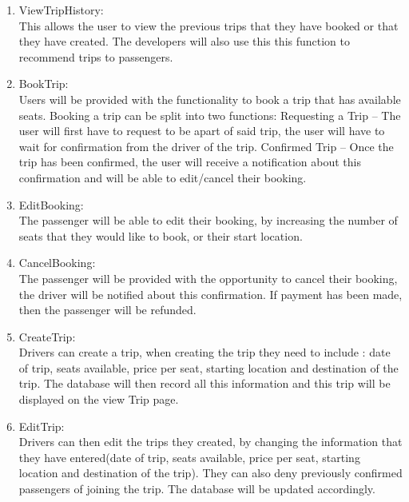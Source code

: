 \documentclass[hidelinks, 12pt, a4paper]{article}
\begin{document}
\begin{enumerate}[label=U1.\arabic*]

      \item ViewTripHistory:\\
            This allows the user to view the previous trips that they have booked or that they have created. The developers will also use this this function to recommend trips to passengers.\\

      \item BookTrip:\\
            Users will be provided with the functionality to book a trip that has available seats. Booking a trip can be split into two functions:
            Requesting a Trip – The user will first have to request to be apart of said trip, the user will have to wait for confirmation from the driver of the trip.
            Confirmed Trip – Once the trip has been confirmed, the user will receive a notification about this confirmation and will be able to edit/cancel their booking.\\

      \item EditBooking:\\
            The passenger will be able to edit their booking, by increasing the number of seats that they would like to book, or their start location.\\

      \item CancelBooking: \\
            The passenger will be provided with the opportunity to cancel their booking, the driver will be notified about this confirmation. If payment has been made, then the passenger will be refunded.\\

      \item CreateTrip:\\
            Drivers can create a  trip, when creating the trip they need to include : date of trip, seats available, price per seat, starting location and destination of the trip. The database will then record all this information and this trip will be displayed on the view Trip page.\\

      \item EditTrip:\\
            Drivers can then edit the trips they created, by changing the information that they have entered(date of trip, seats available, price per seat, starting location and destination of the trip). They can also deny previously confirmed passengers of joining the trip. The database will be updated accordingly.\\


\end{enumerate}
\end{document}
